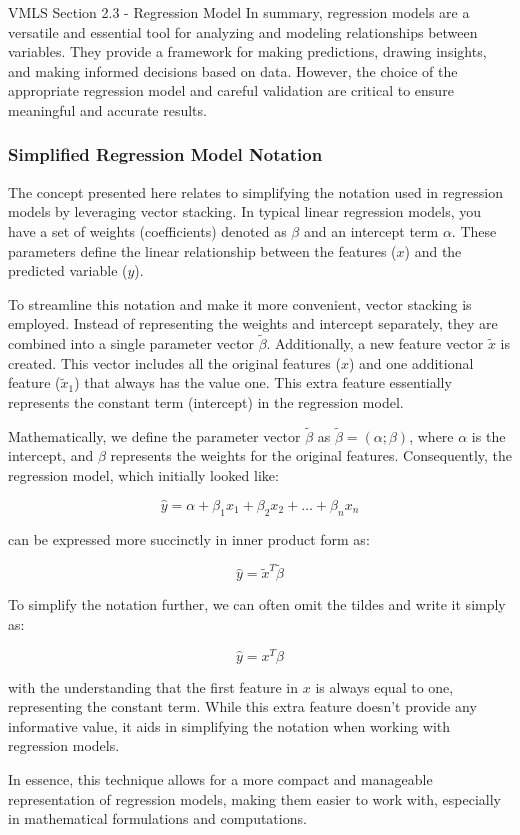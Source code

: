 \begin{notes}{VMLS Section 2.3 - Regression Model}
    In summary, regression models are a versatile and essential tool for analyzing and modeling relationships between variables. They provide a framework for making predictions, drawing insights, and making informed decisions based on data. However, the choice 
    of the appropriate regression model and careful validation are critical to ensure meaningful and accurate results.

    \subsubsection*{Simplified Regression Model Notation}

    The concept presented here relates to simplifying the notation used in regression models by leveraging vector stacking. In typical linear regression models, you have a set of weights (coefficients) denoted as \( \beta \) and an intercept term \( \alpha \). 
    These parameters define the linear relationship between the features (\( x \)) and the predicted variable (\( y \)).
    
    To streamline this notation and make it more convenient, vector stacking is employed. Instead of representing the weights and intercept separately, they are combined into a single parameter vector \( \tilde{\beta} \). Additionally, a new feature vector 
    \( \tilde{x} \) is created. This vector includes all the original features (\( x \)) and one additional feature (\( \tilde{x}_1 \)) that always has the value one. This extra feature essentially represents the constant term (intercept) in the regression model.
    
    Mathematically, we define the parameter vector \( \tilde{\beta} \) as \( \tilde{\beta} = (\alpha; \beta) \), where \( \alpha \) is the intercept, and \( \beta \) represents the weights for the original features. Consequently, the regression model, which 
    initially looked like:
    
    \[
    \hat{y} = \alpha + \beta_1x_1 + \beta_2x_2 + \ldots + \beta_nx_n
    \]
    
    can be expressed more succinctly in inner product form as:
    
    \[
    \hat{y} = \tilde{x}^T \tilde{\beta}
    \]
    
    To simplify the notation further, we can often omit the tildes and write it simply as:
    
    \[
    \hat{y} = x^T \beta
    \]
    
    with the understanding that the first feature in \( x \) is always equal to one, representing the constant term. While this extra feature doesn't provide any informative value, it aids in simplifying the notation when working with regression models.
    
    In essence, this technique allows for a more compact and manageable representation of regression models, making them easier to work with, especially in mathematical formulations and computations.    
    
\end{notes}